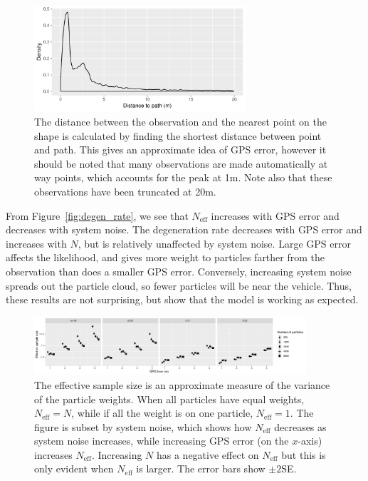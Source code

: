 \begin{figure}[tb]
    \centering
    \includegraphics[width=0.7\textwidth]{figures/04_model_results_dist.pdf}
    \caption{
        The distance between the observation and the nearest point on the shape
        is calculated by finding the shortest distance between point and path.
        This gives an approximate idea of GPS error, however it should be noted
        that many observations are made automatically at way points,
        which accounts for the peak at 1m.
        Note also that these observations have been truncated at 20m.
    }
    \label{fig:dist_to_route}
\end{figure}


From Figure~\ref{fig:degen_rate}, we see that $N_\text{eff}$ increases
with GPS error and decreases with system noise.
The degeneration rate decreases with GPS error and increases with $N$,
but is relatively unaffected by system noise.
Large GPS error affects the likelihood,
and gives more weight to particles farther from the observation
than does a smaller GPS error.
Conversely, increasing system noise spreads out the particle cloud,
so fewer particles will be near the vehicle.
Thus, these results are not surprising, 
but show that the model is working as expected.


\begin{figure}[tb]
    \centering
    \includegraphics[width=0.9\textwidth]{figures/04_model_results_neff.pdf}
    \caption{
        The effective sample size is an approximate measure of the variance
        of the particle weights.
        When all particles have equal weights, $N_\text{eff} = N$,
        while if all the weight is on one particle, $N_\text{eff} = 1$. 
        The figure is subset by system noise, which shows how $N_\text{eff}$ 
        decreases as system noise increases,
        while increasing GPS error (on the $x$-axis) increases $N_\text{eff}$.
        Increasing $N$ has a negative effect on $N_\text{eff}$ but this is
        only evident when $N_\text{eff}$ is larger.
        The error bars show $\pm 2$SE.
    }
    \label{fig:neff}
\end{figure}

